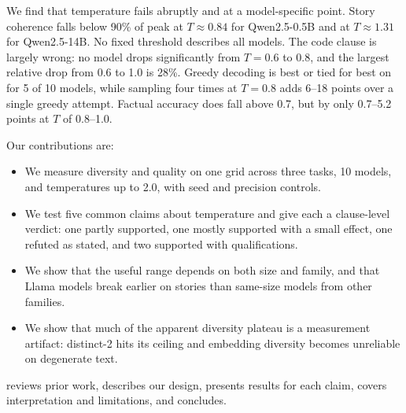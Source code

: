 We find that temperature fails abruptly and at a model-specific point. Story coherence falls below 90\% of peak at $T \approx 0.84$ for Qwen2.5-0.5B and at $T \approx 1.31$ for Qwen2.5-14B. No fixed threshold describes all models. The code clause is largely wrong: no model drops significantly from $T = 0.6$ to $0.8$, and the largest relative drop from 0.6 to 1.0 is 28\%. Greedy decoding is best or tied for best on \passone for 5 of 10 models, while sampling four times at $T = 0.8$ adds 6--18 points over a single greedy attempt. Factual accuracy does fall above 0.7, but by only 0.7--5.2 points at $T$ of 0.8--1.0.

Our contributions are:
\begin{itemize}[leftmargin=*,itemsep=0pt,topsep=0pt]
    \item We measure diversity and quality on one grid across three tasks, 10 models, and temperatures up to 2.0, with seed and precision controls.
    \item We test five common claims about temperature and give each a clause-level verdict: one partly supported, one mostly supported with a small effect, one refuted as stated, and two supported with qualifications.
    \item We show that the useful range depends on both size and family, and that Llama models break earlier on stories than same-size models from other families.
    \item We show that much of the apparent diversity plateau is a measurement artifact: distinct-2 hits its ceiling and embedding diversity becomes unreliable on degenerate text.
\end{itemize}

 reviews prior work,  describes our design,  presents results for each claim,  covers interpretation and limitations, and  concludes.
